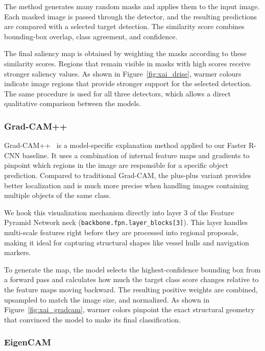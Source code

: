 \documentclass[11pt,a4paper]{article}
\begin{document}
The method generates many random masks and applies them to the input image.
Each masked image is passed through the detector, and the resulting predictions
are compared with a selected target detection. The similarity score combines
bounding-box overlap, class agreement, and confidence.

The final saliency map is obtained by weighting the masks according to these
similarity scores. Regions that remain visible in masks with high scores receive
stronger saliency values.
As shown in Figure~\ref{fig:xai_drise}, warmer colours indicate image regions
that provide stronger support for the selected detection.
The same procedure is used for all three detectors, which allows a direct
qualitative comparison between the models.


\subsubsection{Grad-CAM++}

Grad-CAM++~\cite{chattopadhay2018grad} is a model-specific explanation method applied to 
our Faster R-CNN baseline. It uses a combination of internal feature maps and gradients 
to pinpoint which regions in the image are responsible for a specific object prediction. 
Compared to traditional Grad-CAM, the plus-plus variant provides better localization 
and is much more precise when handling images containing multiple objects of the same class.

We hook this visualization mechanism directly into layer 3 of the Feature Pyramid Network 
neck (\texttt{backbone.fpn.layer\_blocks[3]}). This layer handles multi-scale features right 
before they are processed into regional proposals, making it ideal for capturing structural 
shapes like vessel hulls and navigation markers.

To generate the map, the model selects the highest-confidence bounding box from a forward 
pass and calculates how much the target class score changes relative to the feature maps 
moving backward. The resulting positive weights are combined, upsampled to match the image size, 
and normalized. As shown in Figure~\ref{fig:xai_gradcam}, warmer colors pinpoint the exact 
structural geometry that convinced the model to make its final classification.

\subsubsection{EigenCAM}
\end{document}
